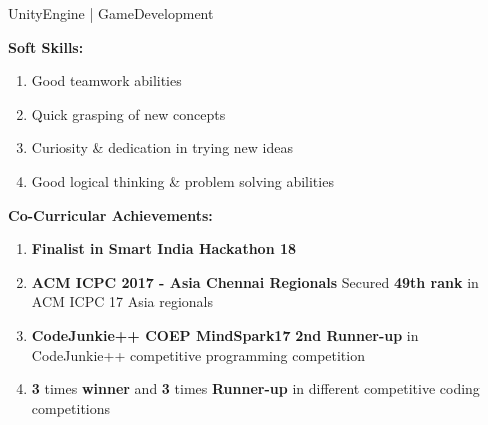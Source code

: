 \documentclass[11pt]{article}
\begin{document}
\begin{center}
\begin{minipage}[t]{0.65\textwidth}
\begin{LARGE}
{\begin{enumerate}
						UnityEngine | GameDevelopment
					\end{enumerate}
				}
			\end{LARGE}								
		\end{minipage}
		\linebreak\linebreak\linebreak
		\begin{minipage}[t]{0.35\textwidth}
			\raggedright\smallskip
			\begin{LARGE}
				\textbf{Soft Skills:}\medskip%
				{\small
					\begin{enumerate}[label=(\roman*)]
						\item Good teamwork abilities
						\item Quick grasping of new concepts
						\item Curiosity \& dedication in trying new ideas
						\item Good logical thinking \& problem solving abilities
					\end{enumerate}
				}
			\end{LARGE}
		\end{minipage}%
		\begin{minipage}[t]{0.65\textwidth}
			\raggedright\smallskip
			\begin{LARGE}
				\textbf{Co-Curricular Achievements:}\medskip%
				{\small
					\begin{enumerate}
						\item \textbf{Finalist in Smart India Hackathon 18}
						\item \textbf{ACM ICPC 2017 - Asia Chennai Regionals}\linebreak
						Secured \textbf{49th rank} in ACM ICPC 17 Asia regionals
						\item \textbf{CodeJunkie++ COEP MindSpark17}\linebreak
						\textbf{2nd Runner-up} in CodeJunkie++ competitive programming competition
						\item \textbf{3} times \textbf{winner} and \textbf{3} times \textbf{Runner-up} in different competitive coding competitions
					\end{enumerate}
				}
			\end{LARGE}								
		\end{minipage}
		\linebreak\linebreak\linebreak
		\raggedright\smallskip
		\begin{LARGE}

\end{LARGE}
\end{center}
\end{document}
